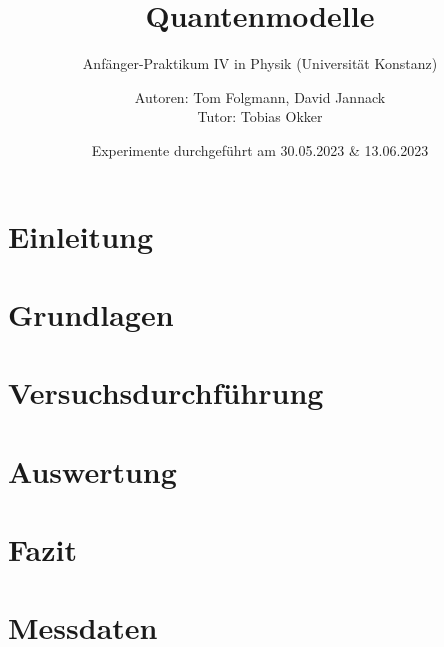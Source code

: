 \documentclass[
    oneside, 
    footinclude=off, 
    captions=tableheading, 
    DIV=12;usenames,
    dvipsnames
]{scrartcl}
\begin{document}
    \title{Quantenmodelle}
    \subtitle{Anfänger-Praktikum IV in Physik (Universität Konstanz)}
    \author{Autoren: Tom Folgmann, David Jannack \\ \large{Tutor: Tobias Okker}}
    \date{Experimente durchgeführt am 30.05.2023 \& 13.06.2023}
    \maketitle
    \thispagestyle{empty}
    \section*{Einleitung}
        

    \newpage


    \tableofcontents
    \thispagestyle{empty}	
    \newpage
    \setcounter{page}{1}


\newpage
\section{Grundlagen}
    
    
	

\newpage
\section{Versuchsdurchführung}
    

\newpage
\section{Auswertung}
    

\newpage
\section{Fazit}
    


\newpage
    
\newpage
    \listoffigures
    \listoftables


\newpage
    \section*{Messdaten}
    
\newpage
    



%
\end{document}
